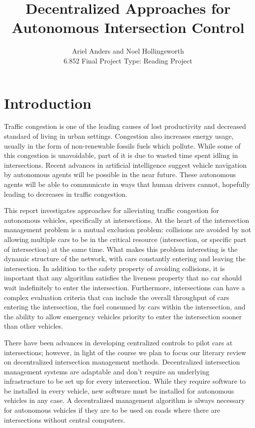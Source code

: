 \documentclass[12pt]{article}
\title{Decentralized Approaches for Autonomous Intersection Control }
\author{Ariel Anders and Noel Hollingsworth\\ 6.852 Final Project Type: Reading Project}
\begin{document}
\maketitle 

\pagebreak
\tableofcontents
\pagebreak

\section{Introduction}

Traffic congestion is one of the leading causes of lost productivity and decreased standard of living in urban settings. Congestion also increases energy usage, usually in the form of non-renewable fossils fuels which pollute. While some of this congestion is unavoidable, part of it is due to wasted time spent idling in intersections. Recent advances in artificial intelligence suggest vehicle navigation by autonomous agents will be possible in the near future.\cite{dresner} These autonomous agents will be able to communicate in ways that human drivers cannot, hopefully leading to decreases in traffic congestion.

This report investigates approaches for alleviating traffic congestion for autonomous vehicles, specifically at intersections. At the heart of the intersection management problem is a mutual exclusion problem: collisions are avoided by not allowing multiple cars to be in the critical resource (intersection, or specific part of intersection) at the same time.  What makes this problem interesting is the dynamic structure of the network, with cars constantly entering and leaving the intersection.  In addition to the safety property of avoiding collisions, it is important that any algorithm satisfies the liveness property that no car should wait indefinitely to enter the intersection.  Furthermore, intersections can have a complex evaluation criteria that can include the overall throughput of cars entering the intersection, the fuel consumed by cars within the intersection, and the ability to allow emergency vehicles priority to enter the intersection sooner than other vehicles. 

There have been advances in developing centralized controls to pilot cars at intersections; however, in light of the course we plan to focus our literary review on decentralized intersection management methods.  Decentralized intersection management systems are adaptable and don't require an underlying infrastructure to be set up for every intersection. While they require software to be installed in every vehicle, new software must be installed for autonomous vehicles in any case. A decentralized management algorithm is always necessary for autonomous vehicles if they are to be used on roads where there are intersections without central computers.
\end{document}
